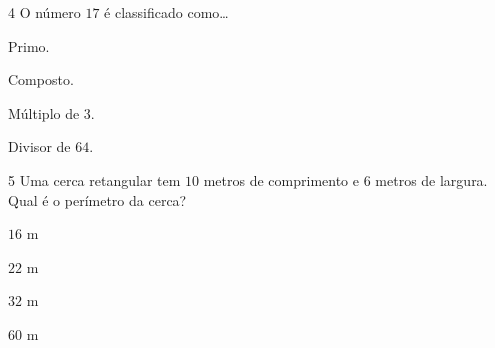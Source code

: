 \num{4}  O número $17$ é classificado como\ldots{}

\begin{escolha}
\item
  Primo.
\item
  Composto.
\item
  Múltiplo de $3$.
\item
  Divisor de $64$.
\end{escolha}




\num{5}  Uma cerca retangular tem $10$ metros de comprimento e $6$ metros de
largura. Qual é o perímetro da cerca?

\begin{escolha}
\item $16$ m
\item $22$ m
\item $32$ m
\item $60$ m
\end{escolha}


